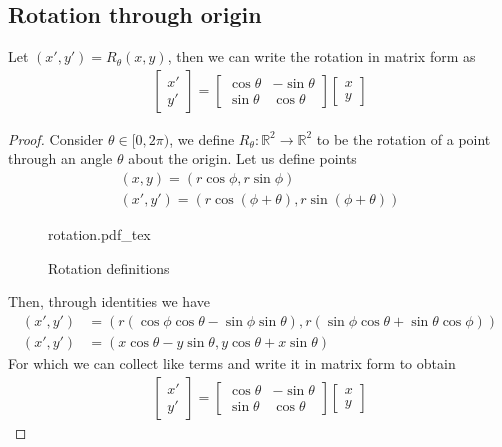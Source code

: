 \documentclass[a4paper]{article}
\newcommand{\incfig}[2][1]{%
    \def\svgwidth{#1\columnwidth}
    {#2.pdf_tex}
}
\theoremstyle{plain}
\theoremstyle{definition}
\newtheorem{defn}{Definition}[section]
\theoremstyle{remark}
\begin{document}
\subsection{Rotation through origin}
\begin{tcolorbox}[colback=black!3!white,colframe=black!60!white,title=\begin{defn}Rotation through origin \label{Rotation through origin}\end{defn}]
Let $(x',y') = R_{\theta}(x,y)$, then we can write the rotation in matrix form as
\begin{align}
	\begin{bmatrix} x' \\ y' \end{bmatrix} = \begin{bmatrix} \cos \theta & - \sin \theta \\
\sin \theta & \cos \theta \end{bmatrix} \begin{bmatrix} x \\ y \end{bmatrix} 
\end{align}
\begin{proof}
	Consider $\theta \in [0,2\pi)$, we define $R_{\theta} : \mathbb{R}^2 \to \mathbb{R}^2$ to be the rotation of a point through an angle $\theta$ about the origin. Let us define points
	\begin{align*}
		(x,y) = (r\cos\phi , r\sin\phi) \\
		(x',y') = (r\cos\left( \phi + \theta \right), r\sin\left( \phi + \theta \right)) 
	\end{align*}
\begin{figure}[H]
    \centering
    \incfig{rotation}
    \caption{Rotation definitions}
    \label{fig:rotation}
\end{figure}
Then, through identities we have
\begin{align*}
	(x',y')&=(r\left( \cos\phi\cos\theta-\sin\phi\sin \theta \right), r\left( \sin\phi\cos\theta + \sin \theta \cos \phi \right) ) \\
	(x',y')&= \left( x\cos\theta - y \sin \theta, y\cos\theta + x \sin \theta \right) 
\end{align*}
For which we can collect like terms and write it in matrix form to obtain
\begin{align*}
	\begin{bmatrix} x' \\ y' \end{bmatrix} = \begin{bmatrix} \cos \theta & -\sin \theta \\ \sin \theta & \cos \theta \end{bmatrix} \begin{bmatrix} x \\ y \end{bmatrix} 
\end{align*}
\end{proof}

\end{tcolorbox}
\end{document}
